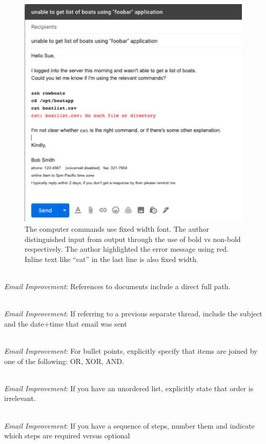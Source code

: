 \begin{figure}
\includegraphics[width=1\textwidth]{images/email_computer_font.pdf}
\caption{The computer commands use fixed width font. The author distinguished input from output through the use of bold vs non-bold respectively. The author highlighted the error message using red. Inline text like ``cat'' in the last line is also fixed width.}
\label{fig:email_computer_font}
\end{figure}

\ \\
\textit{Email Improvement}: References to documents include a direct full path.

\ \\
\textit{Email Improvement}: If referring to a previous separate thread, include the subject and the date+time that email was sent

\ \\
\textit{Email Improvement}: For bullet points, explicitly specify that items are joined by one of the following: OR, XOR, AND.

\ \\
\textit{Email Improvement}: If you have an unordered list, explicitly state that order is irrelevant.

\ \\
\textit{Email Improvement}: If you have a sequence of steps, number them and indicate which steps are required versus optional

